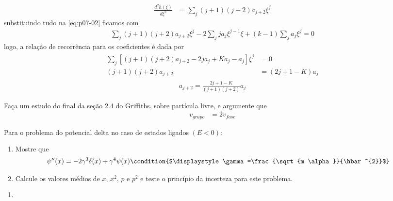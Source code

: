 \begin{prob}
\begin{sol}
\begin{enumerate}[label=\alph *)]
				\begin{align}
					\frac{d^{2}h(\xi)}{d \xi^{2}} &= \sum_{j}(j+1)(j+2)a_{j+2} \xi^{j}
				\end{align}
				substituindo tudo na \eqref{eq:p07-02} ficamos com
				\begin{align}
					\sum_{j}(j+1)(j+2)a_{j+2} \xi^{j}-2\sum_{j}ja_{j} \xi^{j-1} \xi+(k-1)\sum_{j}a_{j}\xi^{j}=0
				\end{align}
				logo, a relação de recorrência para os coeficientes é dada por
				\begin{align}
						\begin{split}
							\sum_{j}\left[(j+1)(j+2)a_{j+2}-2ja_{j}+Ka_{j}-a_{j}\right] \xi^{j} &= 0\\
							(j+1)(j+2)a_{j+2} &= \left(2j+1-K\right)a_{j} 
						\end{split}
				\end{align}
				\begin{align}
						\boxed{
							a_{j+2} = \frac{2j+1-K}{(j+1)(j+2)}a_{j}
						}
				\end{align}


		\end{enumerate}

	\end{sol}
\end{prob}
\begin{prob}
	Faça um estudo do final  da seção  2.4 do Griffiths, sobre partícula livre, e argumente  que
	\begin{align}
		v_{grupo}	&= 2v_{fase}
	\end{align}
\end{prob}
\begin{prob}
	Para o problema do potencial delta no caso de estados ligados $(E<0)$:
	\begin{enumerate}[label=\alph *)]
		\item Mostre que
			\begin{dmath*}
				\psi^{\prime\prime}(x) = -2 \gamma^{3} \delta(x)+\gamma^{4} \psi(x)\condition{$\displaystyle \gamma=\frac{\sqrt{m \alpha}}{\hbar^{2}}$} 
			\end{dmath*}
		\item Calcule os valores médios de $x$, $x^{2}$, $p$ e $p^{2}$ e teste o princípio da incerteza para este problema.
	\end{enumerate}

	\begin{sol}
		\begin{enumerate}[label=\alph *)]
				\item 
		\end{enumerate}


	\end{sol}
\end{prob}

